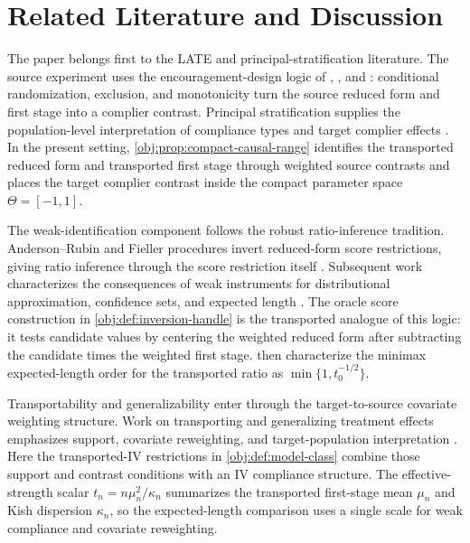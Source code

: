 \section{Related Literature and Discussion}

The paper belongs first to the LATE and principal-stratification literature. The source experiment uses the encouragement-design logic of \citet{Bloom1984}, \citet{ImbensAngrist1994}, and \citet{AngristImbensRubin1996}: conditional randomization, exclusion, and monotonicity turn the source reduced form and first stage into a complier contrast. Principal stratification supplies the population-level interpretation of compliance types and target complier effects \citep{BalkePearl1997,ImbensRubin1997,FrangakisRubin2002,ImbensRosenbaum2005,HeckmanVytlacil2005}. In the present setting, \cref{obj:prop:compact-causal-range} identifies the transported reduced form and transported first stage through weighted source contrasts and places the target complier contrast inside the compact parameter space \(\Theta=[-1,1]\).

The weak-identification component follows the robust ratio-inference tradition. Anderson--Rubin and Fieller procedures invert reduced-form score restrictions, giving ratio inference through the score restriction itself \citep{AndersonRubin1949,Fieller1954}. Subsequent work characterizes the consequences of weak instruments for distributional approximation, confidence sets, and expected length \citep{GleserHwang1987,Dufour1997,BoundJaegerBaker1995,StaigerStock1997,StockWrightYogo2002,Moreira2003,AndrewsMoreiraStock2006,Mikusheva2010,AndrewsStockSun2019,BertanhaMoreira2020,Ma2023,SmuclerLanniMasip2025}. The oracle score construction in \cref{obj:def:inversion-handle} is the transported analogue of this logic: it tests candidate values by centering the weighted reduced form after subtracting the candidate times the weighted first stage.  then characterize the minimax expected-length order for the transported ratio as \(\min\{1,t_0^{-1/2}\}\).

Transportability and generalizability enter through the target-to-source covariate weighting structure. Work on transporting and generalizing treatment effects emphasizes support, covariate reweighting, and target-population interpretation \citep{HotzImbensMortimer2005,PearlBareinboim2011,BareinboimPearl2013,BareinboimPearl2016,ColeStuart2010,StuartColeBradshawLeaf2011,Tipton2013,Dahabreh2020,DahabrehPetitoRobertson2020,Nguyen2017}. Here the transported-IV restrictions in \cref{obj:def:model-class} combine those support and contrast conditions with an IV compliance structure. The effective-strength scalar \(t_n=n\mu_n^2/\kappa_n\) summarizes the transported first-stage mean \(\mu_n\) and Kish dispersion \(\kappa_n\), so the expected-length comparison uses a single scale for weak compliance and covariate reweighting.

